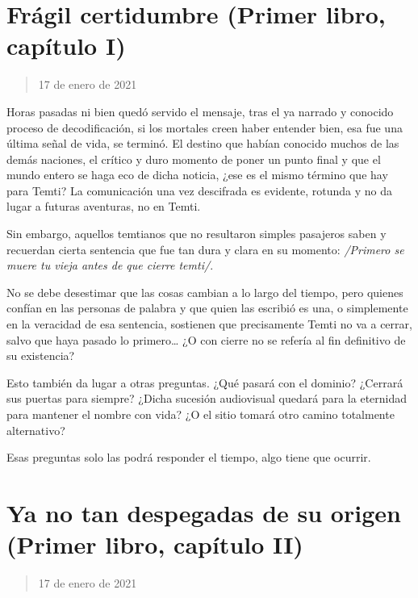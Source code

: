 \documentclass[
  spanish,
]{book}
\begin{document}
\hypertarget{fruxe1gil-certidumbre-primer-libro-capuxedtulo-i}{%
\section{Frágil certidumbre (Primer libro, capítulo I)}\label{fruxe1gil-certidumbre-primer-libro-capuxedtulo-i}}

\begin{quote}
17 de enero de 2021
\end{quote}

Horas pasadas ni bien quedó servido el mensaje, tras el ya narrado y conocido proceso de decodificación, si los mortales creen haber entender bien, esa fue una última señal de vida, se terminó. El destino que habían conocido muchos de las demás naciones, el crítico y duro momento de poner un punto final y que el mundo entero se haga eco de dicha noticia, ¿ese es el mismo término que hay para Temti? La comunicación una vez descifrada es evidente, rotunda y no da lugar a futuras aventuras, no en Temti.

Sin embargo, aquellos temtianos que no resultaron simples pasajeros saben y recuerdan cierta sentencia que fue tan dura y clara en su momento: \emph{/Primero se muere tu vieja antes de que cierre temti/}.

No se debe desestimar que las cosas cambian a lo largo del tiempo, pero quienes confían en las personas de palabra y que quien las escribió es una, o simplemente en la veracidad de esa sentencia, sostienen que precisamente Temti no va a cerrar, salvo que haya pasado lo primero\ldots{} ¿O con cierre no se refería al fin definitivo de su existencia?

Esto también da lugar a otras preguntas. ¿Qué pasará con el dominio? ¿Cerrará sus puertas para siempre? ¿Dicha sucesión audiovisual quedará para la eternidad para mantener el nombre con vida? ¿O el sitio tomará otro camino totalmente alternativo?

Esas preguntas solo las podrá responder el tiempo, algo tiene que ocurrir.

\hypertarget{ya-no-tan-despegadas-de-su-origen-primer-libro-capuxedtulo-ii}{%
\section{Ya no tan despegadas de su origen (Primer libro, capítulo II)}\label{ya-no-tan-despegadas-de-su-origen-primer-libro-capuxedtulo-ii}}

\begin{quote}
17 de enero de 2021
\end{quote}
\end{document}

